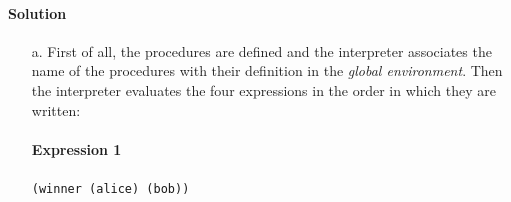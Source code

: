 \paragraph{Solution}
\begin{itemize}
    \item[a.] First of all, the procedures are defined and the interpreter associates the name of the procedures with their definition
        in the \textit{global environment}.
        Then the interpreter evaluates the four expressions in the order in which they are written: 
        
        \paragraph*{Expression 1} \texttt{(winner \textquotesingle(alice) \textquotesingle(bob))} 
        

\end{itemize}
